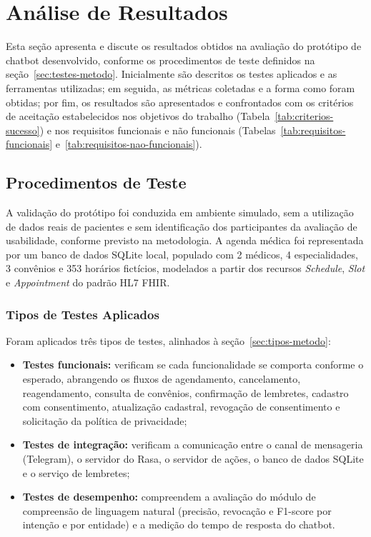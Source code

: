 \documentclass[12pt,a4paper]{extarticle}
\begin{document}
\newpage

\section{Análise de Resultados}
\label{cap:resultados}

Esta seção apresenta e discute os resultados obtidos na avaliação do protótipo de chatbot desenvolvido, conforme os procedimentos de teste definidos na seção~\ref{sec:testes-metodo}. Inicialmente são descritos os testes aplicados e as ferramentas utilizadas; em seguida, as métricas coletadas e a forma como foram obtidas; por fim, os resultados são apresentados e confrontados com os critérios de aceitação estabelecidos nos objetivos do trabalho (Tabela~\ref{tab:criterios-sucesso}) e nos requisitos funcionais e não funcionais (Tabelas~\ref{tab:requisitos-funcionais} e~\ref{tab:requisitos-nao-funcionais}).

\subsection{Procedimentos de Teste}
\label{sec:proc_teste}

A validação do protótipo foi conduzida em ambiente simulado, sem a utilização de dados reais de pacientes e sem identificação dos participantes da avaliação de usabilidade, conforme previsto na metodologia. A agenda médica foi representada por um banco de dados SQLite local, populado com 2 médicos, 4 especialidades, 3 convênios e 353 horários fictícios, modelados a partir dos recursos \textit{Schedule}, \textit{Slot} e \textit{Appointment} do padrão HL7 FHIR.

\subsubsection{Tipos de Testes Aplicados}
\label{sec:tipos_testes}

Foram aplicados três tipos de testes, alinhados à seção~\ref{sec:tipos-metodo}:

\begin{itemize}
    \item \textbf{Testes funcionais:} verificam se cada funcionalidade se comporta conforme o esperado, abrangendo os fluxos de agendamento, cancelamento, reagendamento, consulta de convênios, confirmação de lembretes, cadastro com consentimento, atualização cadastral, revogação de consentimento e solicitação da política de privacidade;
    \item \textbf{Testes de integração:} verificam a comunicação entre o canal de mensageria (Telegram), o servidor do Rasa, o servidor de ações, o banco de dados SQLite e o serviço de lembretes;
    \item \textbf{Testes de desempenho:} compreendem a avaliação do módulo de compreensão de linguagem natural (precisão, revocação e F1-score por intenção e por entidade) e a medição do tempo de resposta do chatbot.
\end{itemize}
\end{document}
